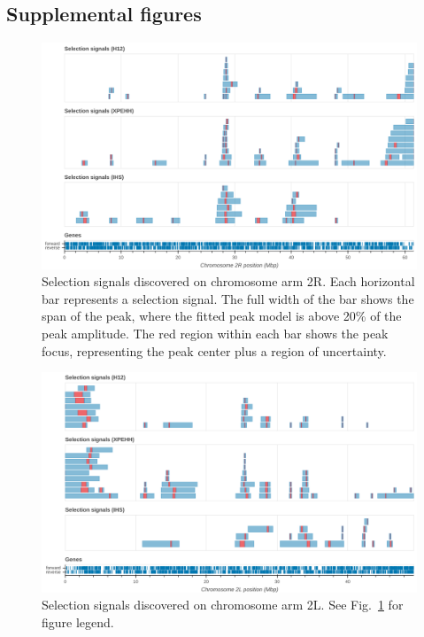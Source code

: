 \begin{refsection}
\section{Supplemental figures}\label{sec:ch5-supplemental-figures}


\begin{figure}[h!]
\centering
\includegraphics[width=1.1\textwidth,center]{artwork/chapter5/signals_2R.png}
\caption{Selection signals discovered on chromosome arm 2R.
%
Each horizontal bar represents a selection signal.
%
The full width of the bar shows the span of the peak, where the fitted peak model is above 20\% of the peak amplitude.
%
The red region within each bar shows the peak focus, representing the peak center plus a region of uncertainty.
%
}
\label{fig:signals_2R}
\end{figure}


\clearpage
\begin{figure}[h!]
\centering
\includegraphics[width=1.1\textwidth,center]{artwork/chapter5/signals_2L.png}
\caption{Selection signals discovered on chromosome arm 2L.
%
See Fig.~\ref{fig:signals_2R} for figure legend.
}
\label{fig:signals_2L}
\end{figure}



\end{refsection}
